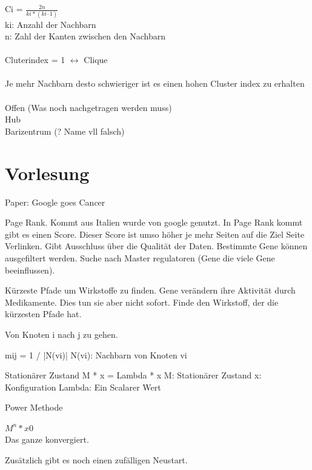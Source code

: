 \documentclass{article}
\begin{document}
\\

\\

Ci = $\frac{2n}{ki * (ki – 1)}$\\
ki: Anzahl der Nachbarn\\
n: Zahl der Kanten zwischen den Nachbarn\\
\\

Cluterindex = 1  $\leftrightarrow$ Clique\\
\\

Je mehr Nachbarn desto schwieriger ist es einen hohen Cluster index zu erhalten\\
\\

Offen (Was noch nachgetragen werden muss)\\
Hub\\
Barizentrum (? Name vll falsch)\\


\newpage
\section{Vorlesung}
Paper: Google goes Cancer


Page Rank. Kommt aus Italien wurde von google genutzt. In Page Rank kommt gibt es einen Score. Dieser Score ist umso höher je mehr Seiten auf die Ziel Seite Verlinken. 
Gibt Ausschluss über die Qualität der Daten. Bestimmte Gene können ausgefiltert werden. Suche nach Master regulatoren (Gene die viele Gene beeinflussen). 

Kürzeste Pfade um Wirkstoffe zu finden. Gene  verändern ihre Aktivität durch Medikamente. Dies tun sie aber nicht sofort. Finde den Wirkstoff, der die  kürzesten Pfade hat.

Von Knoten i nach j zu gehen. 

mij = 1 / |N(vi)|
N(vi): Nachbarn von Knoten vi


Stationärer Zustand
M * x = Lambda * x
M: Stationärer Zustand 
x: Konfiguration
Lambda: Ein Scalarer Wert

Power Methode

$M^n * x0 $\\
Das ganze konvergiert. 

Zusätzlich gibt es noch einen zufälligen Neustart. 
\end{document}
